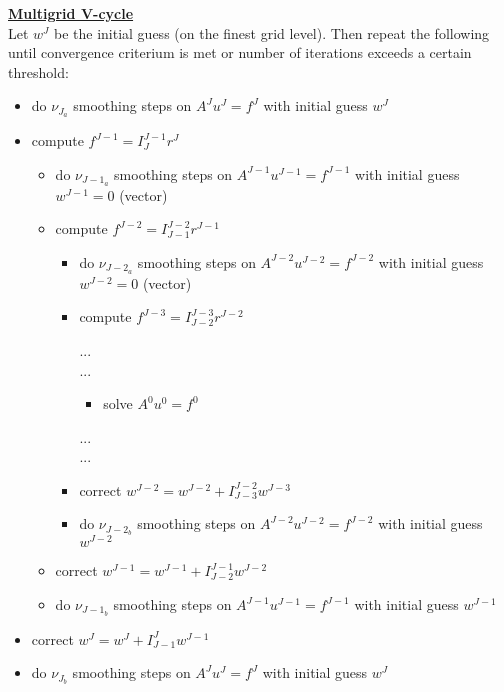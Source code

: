 \documentclass[../draft_1.tex]{subfiles}
\begin{document}
\begin{framed}
	\underline{\textbf{Multigrid V-cycle}} 
	\smallskip 
	\\
	Let $w^J$ be the initial guess (on the finest grid level). Then repeat the following until convergence criterium is met or number of iterations exceeds a certain threshold:
	
	\begin{itemize}
		\item do $\nu_{J_a}$ smoothing steps on $A^J u^J = f^J$ with initial guess $w^J$
		\item compute $f^{J-1} = I_{J}^{J-1} r^J$
		\begin{itemize}
			\item do $\nu_{J-1_a}$ smoothing steps on $A^{J-1} u^{J-1} = f^{J-1}$ with initial guess $w^{J-1} = 0$ (vector)
			\item compute $f^{J-2} = I_{J-1}^{J-2} r^{J-1}$
			\begin{itemize}
				\item do $\nu_{J-2_a}$ smoothing steps on $A^{J-2} u^{J-2} = f^{J-2}$ with initial guess $w^{J-2} = 0$ (vector)
				\item compute $f^{J-3} = I_{J-2}^{J-3} r^{J-2}$
		
		... \\
		...
				\begin{itemize}
				\item solve $A^0 u^0 = f^0$
				\end{itemize}	
		... \\
		...
		
			\item correct $w^{J-2} = w^{J-2} + I_{J-3}^{J-2} w^{J-3}$
			\item do $\nu_{J-2_b}$ smoothing steps on $A^{J-2} u^{J-2} = f^{J-2}$ with initial guess $w^{J-2}$
			\end{itemize}	
		\item correct $w^{J-1} = w^{J-1} + I_{J-2}^{J-1} w^{J-2}$
		\item do $\nu_{{J-1}_b}$ smoothing steps on $A^{J-1} u^{J-1} = f^{J-1}$ with initial guess $w^{J-1}$		
			\end{itemize}	
		\item correct $w^{J} = w^{J} + I_{J-1}^{J} w^{J-1}$
		\item do $\nu_{J_b}$ smoothing steps on $A^{J} u^{J} = f^{J}$ with initial guess $w^{J}$
	\end{itemize}	
\end{framed}
\end{document}
